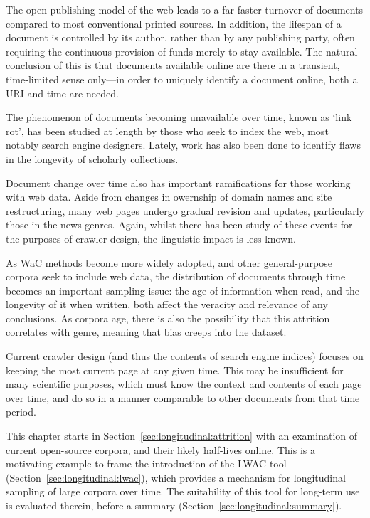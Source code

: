 The open publishing model of the web leads to a far faster turnover of documents compared to most conventional printed sources.  In addition, the lifespan of a document is controlled by its author, rather than by any publishing party, often requiring the continuous provision of funds merely to stay available.  The natural conclusion of this is that documents available online are there in a transient, time-limited sense only---in order to uniquely identify a document online, both a URI and time are needed.

The phenomenon of documents becoming unavailable over time, known as `link rot', has been studied at length by those who seek to index the web, most notably search engine designers.  Lately, work has also been done to identify flaws in the longevity of scholarly collections\cite{101371journalpone0115253}.

Document change over time also has important ramifications for those working with web data.  Aside from changes in owernship of domain names and site restructuring, many web pages undergo gradual revision and updates, particularly those in the news genres.  Again, whilst there has been study of these events for the purposes of crawler design, the linguistic impact is less known.

As WaC methods become more widely adopted, and other general-purpose corpora seek to include web data, the distribution of documents through time becomes an important sampling issue: the age of information when read, and the longevity of it when written, both affect the veracity and relevance of any conclusions.  As corpora age, there is also the possibility that this attrition correlates with genre, meaning that bias creeps into the dataset.

Current crawler design (and thus the contents of search engine indices) focuses on keeping the most current page at any given time.  This may be insufficient for many scientific purposes, which must know the context and contents of each page over time, and do so in a manner comparable to other documents from that time period.

This chapter starts in Section~\ref{sec:longitudinal:attrition} with an examination of current open-source corpora, and their likely half-lives online.  This is a motivating example to frame the introduction of the LWAC tool (Section~\ref{sec:longitudinal:lwac}), which provides a mechanism for longitudinal sampling of large corpora over time.  The suitability of this tool for long-term use is evaluated therein, before a summary (Section~\ref{sec:longitudinal:summary}).


